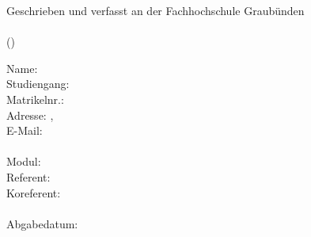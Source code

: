 \begin{titlepage}
    
    \begin{center}
        Geschrieben und verfasst an der Fachhochschule Graubünden\\
        \vspace{30mm}
        \huge\textbf{\haupttitel}\\
        \hfill \break
        \large{(\untertitel)}
    \end{center}
    
    \vfill
    
    \begin{flushleft}
    Name: \autorenschaft\\
    Studiengang: \studiengang\\
    Matrikelnr.: \matrikelnummer\\
    Adresse: \adresse, \plz~\ort\\
    E-Mail: \email\\
    ~\\
    Modul: \modul\\
    Referent: \\
    Koreferent: \coRefe\\
    ~\\
    Abgabedatum: \abgabedatum
    \end{flushleft}
    
    \vspace{20mm}
    
\end{titlepage}
